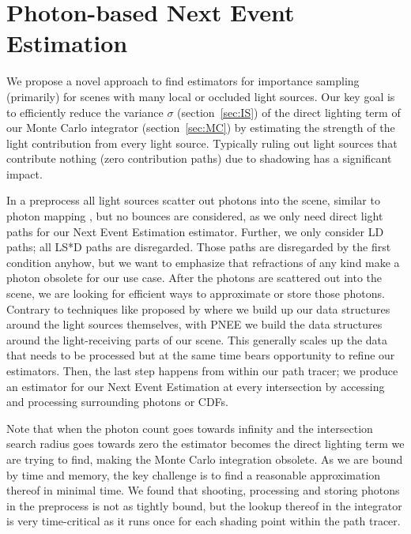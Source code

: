 
\chapter{Photon-based Next Event Estimation}
\label{ch:PNEE}

We propose a novel approach to find estimators for importance sampling (primarily) for scenes with many local or occluded light sources. Our key goal is to efficiently reduce the variance $\sigma$ (section~\ref{sec:IS})  of the direct lighting term of our Monte Carlo integrator (section~\ref{sec:MC}) by estimating the strength of the light contribution from every light source. Typically ruling out light sources that contribute nothing (zero contribution paths) due to shadowing has a significant impact.

In a preprocess all light sources scatter out photons into the scene, similar to photon mapping \cite{jensen2001realistic}, but no bounces are considered, as we only need direct light paths for our Next Event Estimation estimator. Further, we only consider LD paths; all LS*D paths are disregarded. Those paths are disregarded by the first condition anyhow, but we want to emphasize that refractions of any kind make a photon obsolete for our use case. After the photons are scattered out into the scene, we are looking for efficient ways to approximate or store those photons. Contrary to techniques like proposed by \cite{Estevez} where we build up our data structures around the light sources themselves, with PNEE we build the data structures around the light-receiving parts of our scene. This generally scales up the data that needs to be processed but at the same time bears opportunity to refine our estimators. Then, the last step happens from within our path tracer; we produce an estimator for our Next Event Estimation at every intersection by accessing and processing surrounding photons or CDFs.

Note that when the photon count goes towards infinity and the intersection search radius goes towards zero the estimator becomes the direct lighting term we are trying to find, making the Monte Carlo integration obsolete. As we are bound by time and memory, the key challenge is to find a reasonable approximation thereof in minimal time. We found that shooting, processing and storing photons in the preprocess is not as tightly bound, but the lookup thereof in the integrator is very time-critical as it runs once for each shading point within the path tracer.



